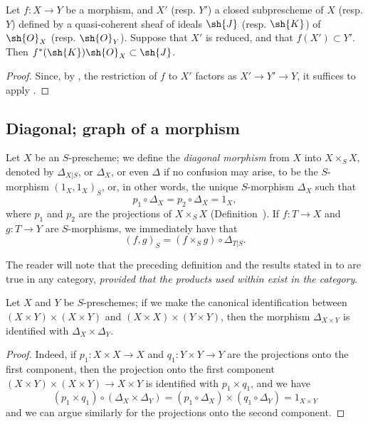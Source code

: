 \begin{corollary}[5.2.4]
\label{I.5.2.4}
Let $f:X\to Y$ be a morphism, and $X'$ (resp. $Y'$) a closed subprescheme of $X$ (resp. $Y$) defined by a quasi-coherent sheaf of ideals $\sh{J}$ (resp. $\sh{K}$) of $\sh{O}_X$ (resp. $\sh{O}_Y$).
Suppose that $X'$ is reduced, and that $f(X')\subset Y'$.
Then $f^*(\sh{K})\sh{O}_X\subset\sh{J}$.
\end{corollary}

\begin{proof}
Since, by , the restriction of $f$ to $X'$ factors as $X'\to Y'\to Y$, it suffices to apply .
\end{proof}

\subsection{Diagonal; graph of a morphism}
\label{subsection:I.5.3}

\begin{env}[5.3.1]
\label{I.5.3.1}
Let $X$ be an $S$-prescheme;
we define the \emph{diagonal morphism} from $X$ into $X\times_S X$, denoted by $\Delta_{X|S}$, or $\Delta_X$, or even $\Delta$ if no confusion may arise, to be the $S$-morphism $(1_X,1_X)_S$, or, in other words, the unique $S$-morphism $\Delta_X$ such that
\[
\label{I.5.3.1.1}
  p_1\circ\Delta_X=p_2\circ\Delta_X=1_X,
  \tag{5.3.1.1}
\]
where $p_1$ and $p_2$ are the projections of $X\times_S X$ (Definition~).
If $f:T\to X$ and $g:T\to Y$ are $S$-morphisms, we immediately have that
\[
\label{I.5.3.1.2}
  (f,g)_S=(f\times_S g)\circ\Delta_{T|S}.
  \tag{5.3.1.2}
\]

The reader will note that the preceding definition and the results stated in  to  are true in any category, \emph{provided that the products used within exist in the category}.
\end{env}

\begin{proposition}[5.3.2]
\label{I.5.3.2}
Let $X$ and $Y$ be $S$-preschemes;
if we make the canonical identification between $(X\times Y)\times(X\times Y)$ and $(X\times X)\times(Y\times Y)$, then the morphism $\Delta_{X\times Y}$ is identified with $\Delta_X\times\Delta_Y$.
\end{proposition}

\begin{proof}
Indeed, if $p_1:X\times X\to X$ and $q_1:Y\times Y\to Y$ are the projections onto the first component, then the projection onto the first component $(X\times Y)\times(X\times Y)\to X\times Y$ is identified with $p_1\times q_1$, and we have
\[
  (p_1\times q_1)\circ(\Delta_X\times\Delta_Y)=(p_1\circ\Delta_X)\times(q_1\circ\Delta_Y)=1_{X\times Y}
\]
and we can argue similarly for the projections onto the second component.
\end{proof}

